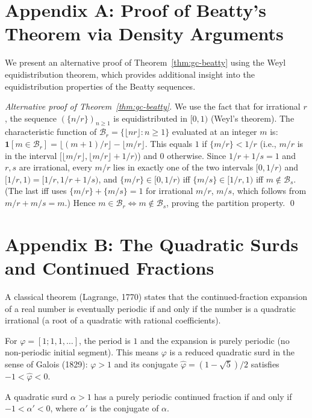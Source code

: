 \section{Appendix A: Proof of Beatty's Theorem via
Density Arguments}
\label{sec:gc-appendix-beatty}

We present an alternative proof of
Theorem~\ref{thm:gc-beatty} using the Weyl
equidistribution theorem, which provides additional
insight into the equidistribution properties of
the Beatty sequences.

\begin{proof}[Alternative proof of Theorem~\ref{thm:gc-beatty}]
We use the fact that for irrational $r$, the sequence
$(\{n/r\})_{n \geq 1}$ is equidistributed in $[0,1)$
(Weyl's theorem).
The characteristic function of
$\mathcal{B}_r = \{\lfloor nr \rfloor : n \geq 1\}$
evaluated at an integer $m$ is:
$\mathbf{1}[m \in \mathcal{B}_r] = \lfloor (m+1)/r \rfloor - \lfloor m/r \rfloor$.
This equals $1$ if $\{m/r\} < 1/r$ (i.e., $m/r$ is
in the interval $[\lfloor m/r \rfloor, \lfloor m/r \rfloor + 1/r)$)
and $0$ otherwise.
Since $1/r + 1/s = 1$ and $r, s$ are irrational,
every $m/r$ lies in exactly one of the two intervals
$[0, 1/r)$ and $[1/r, 1) = [1/r, 1/r + 1/s)$,
and $\{m/r\} \in [0, 1/r)$ iff $\{m/s\} \in [1/r, 1)$
iff $m \notin \mathcal{B}_s$.
(The last iff uses $\{m/r\} + \{m/s\} = 1$ for
irrational $m/r$, $m/s$, which follows from
$m/r + m/s = m$.)
Hence $m \in \mathcal{B}_r \iff m \notin \mathcal{B}_s$,
proving the partition property.
\qed
\end{proof}

\section{Appendix B: The Quadratic Surds and Continued Fractions}
\label{sec:gc-appendix-qsurd}

A classical theorem (Lagrange, 1770) states that the
continued-fraction expansion of a real number is
eventually periodic if and only if the number is a
quadratic irrational (a root of a quadratic with
rational coefficients).

For $\varphi = [1;1,1,\ldots]$, the period is $1$
and the expansion is purely periodic (no non-periodic
initial segment).
This means $\varphi$ is a reduced quadratic surd in
the sense of Galois (1829): $\varphi > 1$ and its
conjugate $\hat\varphi = (1-\sqrt{5})/2$ satisfies
$-1 < \hat\varphi < 0$.

\begin{theorem}[Galois, 1829]
A quadratic surd $\alpha > 1$ has a purely periodic
continued fraction if and only if $-1 < \alpha' < 0$,
where $\alpha'$ is the conjugate of $\alpha$.
\end{theorem}

